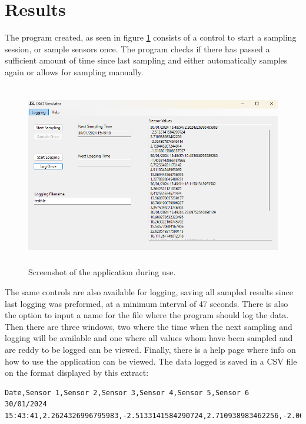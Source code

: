 \documentclass[11pt, A4paper, norsk]{article}
\begin{document}
	\section{Results}
The program created, as seen in figure \ref{ex} consists of a control to start a sampling session, or sample sensors once. The program checks if there has passed a sufficient amount of time since last sampling and either automatically samples again or allows for sampling manually. 
		\begin{figure}
\includegraphics[width=13cm, height=8cm]{Application_Example.png}
\caption{Screenshot of the application during use.}
\label{ex}
		\end{figure}
The same controls are also available for logging, saving all sampled results since last logging was preformed, at a minimum interval of 47 seconds. There is also the option to input a name for the file where the program should log the data. Then there are three windows, two where the time when the next sampling and logging will be available and one where all values whom have been sampled and are reddy to be logged can be viewed. Finally, there is a help page where info on how to use the application can be viewed.
The data logged is saved in a CSV file on the format displayed by this extract:
		\begin{lstlisting}
Date,Sensor 1,Sensor 2,Sensor 3,Sensor 4,Sensor 5,Sensor 6
30/01/2024 15:43:41,2.2624326996795983,-2.5133141584290724,2.710938983462256,-2.064807874646414,3.159445267244914,-1.6163015908637557
		\end{lstlisting}
\end{document}
